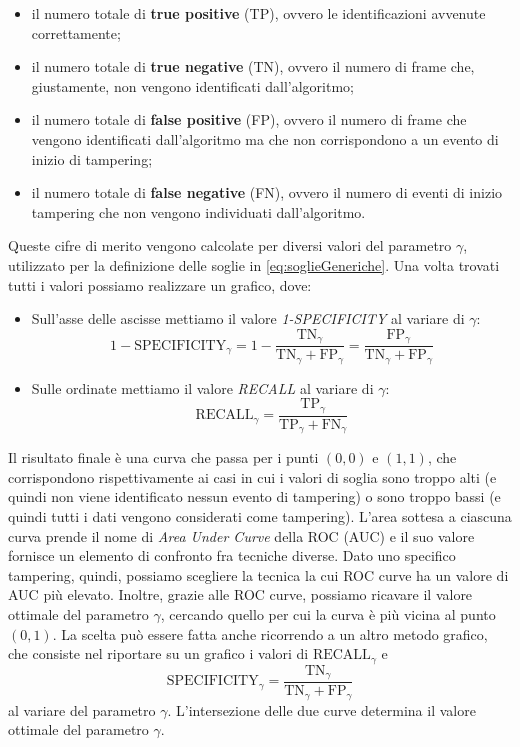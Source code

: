 \begin{itemize}
	\item il numero totale di \textbf{true positive} (TP), ovvero le identificazioni avvenute correttamente;
	\item il numero totale di \textbf{true negative} (TN), ovvero il numero di frame che, giustamente, non vengono identificati dall'algoritmo;
	\item il numero totale di \textbf{false positive} (FP), ovvero il numero di frame che vengono identificati dall'algoritmo ma che non corrispondono a un evento di inizio di tampering;
	\item il numero totale di \textbf{false negative} (FN), ovvero il numero di eventi di inizio tampering che non vengono individuati dall'algoritmo.
\end{itemize}
Queste cifre di merito vengono calcolate per diversi valori del parametro $\gamma$, utilizzato per la definizione delle soglie in \eqref{eq:soglieGeneriche}.
Una volta trovati tutti i valori possiamo realizzare un grafico, dove:
\begin{itemize}
	\item Sull'asse delle ascisse mettiamo il valore \textit{1-SPECIFICITY} al variare di $\gamma$:
	\[1-\text{SPECIFICITY}_\gamma = 1-\frac{\text{TN}_\gamma}{\text{TN}_\gamma+\text{FP}_\gamma}=\frac{\text{FP}_\gamma}{\text{TN}_\gamma+\text{FP}_\gamma}\]
	\item Sulle ordinate mettiamo il valore \textit{RECALL} al variare di $\gamma$:
	\[\text{RECALL}_\gamma=\frac{\text{TP}_\gamma}{\text{TP}_\gamma+\text{FN}_\gamma} \]
\end{itemize}
Il risultato finale \`e una curva che passa per i punti $(0,0)$ e $(1,1)$, che corrispondono rispettivamente ai casi in cui i valori di soglia sono troppo alti (e quindi non viene identificato nessun evento di tampering) o sono troppo bassi (e quindi tutti i dati vengono considerati come tampering).
L'area sottesa a ciascuna curva prende il nome di \textit{Area Under Curve} della ROC (AUC) e il suo valore fornisce un elemento di confronto fra tecniche diverse.  
Dato uno specifico tampering, quindi, possiamo scegliere la tecnica la cui ROC curve ha un valore di AUC pi\`u elevato.
Inoltre, grazie alle ROC curve, possiamo ricavare il valore ottimale del parametro $\gamma$, cercando quello per cui la curva \`e pi\`u vicina al punto $(0,1)$.
La scelta pu\`o essere fatta anche ricorrendo a un altro metodo grafico, che consiste nel riportare su un grafico i valori di $\text{RECALL}_\gamma$ e \[\text{SPECIFICITY}_\gamma= \frac{\text{TN}_\gamma}{\text{TN}_\gamma+\text{FP}_\gamma}\]
al variare del parametro $\gamma$.
L'intersezione delle due curve determina il valore ottimale del parametro $\gamma$.

